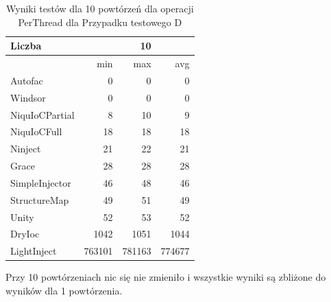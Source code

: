 \documentclass[12pt]{article}
\begin{document}
\begin{table}[H]
\captionsetup{belowskip=0pt,aboveskip=0pt}
\begin{center}
\begin{small}
	\begin{tabular}{ | l | r r r | }
    		\hline
Liczba & & 10 & \\ \hline
 & min & max & avg \\ \hline
Autofac & 0 & 0 & 0 \\ \hline
Windsor & 0 & 0 & 0 \\ \hline
NiquIoCPartial & 8 & 10 & 9 \\ \hline
NiquIoCFull & 18 & 18 & 18 \\ \hline
Ninject & 21 & 22 & 21 \\ \hline
Grace & 28 & 28 & 28 \\ \hline
SimpleInjector & 46 & 48 & 46 \\ \hline
StructureMap & 49 & 51 & 49 \\ \hline
Unity & 52 & 53 & 52 \\ \hline
DryIoc & 1042 & 1051 & 1044 \\ \hline
LightInject & 763101 & 781163 & 774677 \\ \hline
  	\end{tabular}
\end{small}
\end{center}
\caption{Wyniki testów dla 10 powtórzeń dla operacji PerThread dla Przypadku testowego D}
\label{TestCaseB_PerThread10}
\end{table}
Przy 10 powtórzeniach nic się nie zmieniło i wszystkie wyniki są zbliżone do wyników dla 1 powtórzenia.
\end{document}
